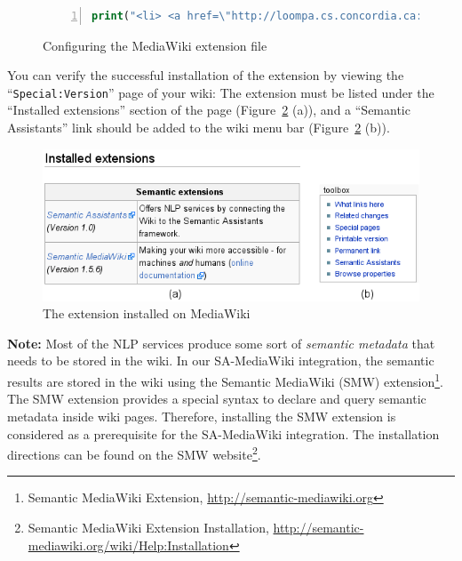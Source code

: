\begin{figure}[h!]
\centering
\begin{lstlisting}[language=PHP,numbers=left,xleftmargin=4mm,columns=flexible]
print("<li> <a href=\"http://loompa.cs.concordia.ca:8080/SA-WikiConnector/SemAssistServlet?action=proxy\">Semantic Assistants</a></li>");\end{lstlisting}
\caption{Configuring the \sa MediaWiki extension file}
\label{list:mediawiki_sa_extension_config}
\end{figure}

You can verify the successful installation of the \sa extension by viewing the ``\texttt{Special:Version}'' page of your wiki: The \sa extension must be listed under the ``Installed extensions'' section of the page (Figure~\ref{fig:semassist_plugin} (a)), and a ``Semantic Assistants'' link should be added to the wiki menu bar (Figure~\ref{fig:semassist_plugin} (b)).

\begin{figure}
\centering
\includegraphics[scale=0.8]{pictures/semassist_plugin.png}
\caption{The \sa extension installed on MediaWiki}
\label{fig:semassist_plugin}
\end{figure}

\blankline
\noindent
\textbf{Note:} Most of the NLP services produce some sort of \emph{semantic metadata} that needs to be stored in the wiki. In our SA-MediaWiki integration, the semantic results are stored in the wiki using the Semantic MediaWiki (SMW) extension\footnote{Semantic MediaWiki Extension, \url{http://semantic-mediawiki.org}}. The SMW extension provides a special syntax to declare and query semantic metadata inside wiki pages. Therefore, installing the SMW extension is considered as a prerequisite for the SA-MediaWiki integration. The installation directions can be found on the SMW website\footnote{Semantic MediaWiki Extension Installation, \url{http://semantic-mediawiki.org/wiki/Help:Installation}}.

